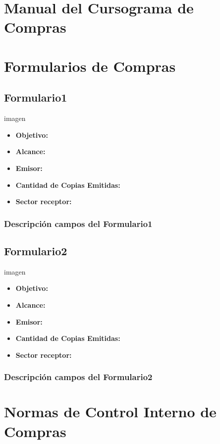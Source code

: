 \pagebreak
\section{Manual del Cursograma de Compras}


\pagebreak
\section{Formularios de Compras}
\subsection{Formulario1}
imagen
\begin{itemize}
  \item \textbf{Objetivo:}
  \item \textbf{Alcance:}
  \item \textbf{Emisor:}
  \item \textbf{Cantidad de Copias Emitidas:}
  \item \textbf{Sector receptor:}
 \end{itemize}
\subsubsection{Descripci\'on campos del Formulario1}

\subsection{Formulario2}
imagen
\begin{itemize}
  \item \textbf{Objetivo:}
  \item \textbf{Alcance:}
  \item \textbf{Emisor:}
  \item \textbf{Cantidad de Copias Emitidas:}
  \item \textbf{Sector receptor:}
 \end{itemize}
\subsubsection{Descripci\'on campos del Formulario2}

\pagebreak
\section{Normas de Control Interno de Compras}
